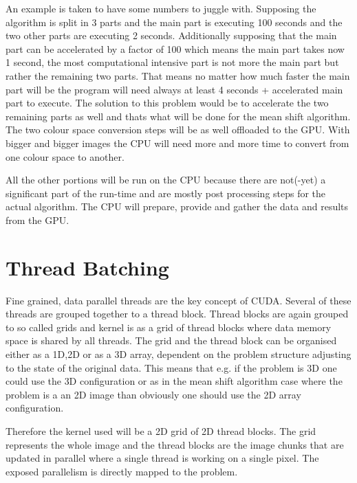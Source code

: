 An example is taken to have some numbers to juggle with. Supposing the algorithm
is split in 3 parts and the main part is executing 100 seconds and the two other
parts are executing 2 seconds. Additionally supposing that the main part can be
accelerated by a factor of 100 which means the main part takes now 1 second, the
most computational intensive part is not more the main part but rather the
remaining two parts. That means no matter how much faster the main part will be
the program will need always at least 4 seconds + accelerated main part to
execute. The solution to this problem would be to accelerate the two remaining
parts as well and thats what will be done for the mean shift algorithm. The two
colour space conversion steps will be as well offloaded to the \gls{GPU}. With
bigger and bigger images the \gls{CPU} will need more and more time to convert
from one colour space to another. 


All the other portions will be run on the \gls{CPU} because there are not(-yet) a
significant part of the run-time and are mostly post processing steps for the actual
algorithm. The \gls{CPU} will prepare, provide and gather the data and results
from the \gls{GPU}. 

\section{Thread Batching} %
\label{sec:cuda_thread_hierarchy}

Fine grained, data parallel threads are the key concept of \gls{CUDA}. Several
of these threads are grouped together to a thread block. Thread blocks are again
grouped to so called grids and kernel is as a grid of thread blocks where data 
memory space is shared by all threads. The grid and the thread block can be 
organised either as a \gls{1D},\gls{2D} or as a \gls{3D} array, dependent on 
the problem structure adjusting to the state of the original data. This means 
that e.g. if the problem is \gls{3D} one could use the \gls{3D} configuration or
as in the mean shift algorithm case where the problem is a an \gls{2D} image than
obviously one should use the \gls{2D} array configuration.

Therefore the kernel used will be a \gls{2D} grid of \gls{2D} thread blocks. The
grid represents the whole image and the thread blocks are the image chunks that
are updated in parallel where a single thread is working on a single pixel. The 
exposed parallelism is directly mapped to the problem.  

